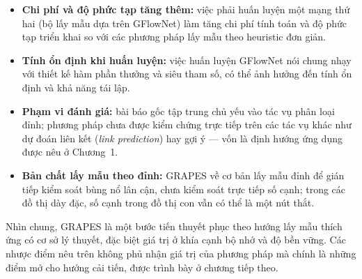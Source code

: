 \begin{itemize}
    \item \textbf{Chi phí và độ phức tạp tăng thêm:} việc phải huấn luyện một mạng thứ hai (bộ lấy mẫu dựa trên GFlowNet) làm tăng chi phí tính toán và độ phức tạp triển khai so với các phương pháp lấy mẫu theo heuristic đơn giản.
    \item \textbf{Tính ổn định khi huấn luyện:} việc huấn luyện GFlowNet nói chung nhạy với thiết kế hàm phần thưởng và siêu tham số, có thể ảnh hưởng đến tính ổn định và khả năng tái lập.
    \item \textbf{Phạm vi đánh giá:} bài báo gốc tập trung chủ yếu vào tác vụ phân loại đỉnh; phương pháp chưa được kiểm chứng trực tiếp trên các tác vụ khác như dự đoán liên kết (\textit{link prediction}) hay gợi ý --- vốn là định hướng ứng dụng được nêu ở Chương~1.
    \item \textbf{Bản chất lấy mẫu theo đỉnh:} GRAPES về cơ bản lấy mẫu đỉnh để gián tiếp kiểm soát bùng nổ lân cận, chưa kiểm soát trực tiếp số cạnh; trong các đồ thị dày đặc, số cạnh trong đồ thị con vẫn có thể là một nút thắt.
\end{itemize}

Nhìn chung, GRAPES là một bước tiến thuyết phục theo hướng lấy mẫu thích ứng có cơ sở lý thuyết, đặc biệt giá trị ở khía cạnh bộ nhớ và độ bền vững. Các nhược điểm nêu trên không phủ nhận giá trị của phương pháp mà chính là những điểm mở cho hướng cải tiến, được trình bày ở chương tiếp theo.
